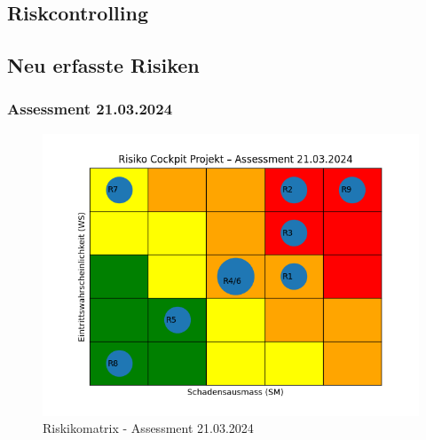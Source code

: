 
    \clearpage
    \recalctypearea
\begin{flushleft}
    \section{Riskcontrolling}
    \label{sec:riskcrontolling}
    \subsection{Neu erfasste Risiken}
    
        \subsubsection{Assessment 21.03.2024}
        
\end{flushleft}
\clearpage
{}
\recalctypearea
\begin{flushleft}
    \begin{figure}[H]
        \centering
        \includegraphics[width=0.75\linewidth]{source/riskmatrix/project-assessment-21-03-2024}
        \caption{Riskikomatrix - Assessment 21.03.2024}
        \label{fig:project-assessment-21-03-2024}
    \end{figure}
\end{flushleft}
